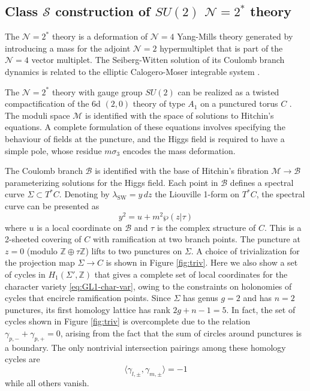 \documentclass{article}
\numberwithin{equation}{section}
\newcommand{\IZ}{\mathbb{Z}}
\newcommand{\CS}{\mathcal{S}}
\def\be{\begin{equation}}
\def\ee{\end{equation}}
\def\IZ{{\mathbb{Z}}}
\def\CB{{\mathcal{B}}}
\def\CM{{\mathcal{M}}}
\def\CN{{\mathcal{N}}}
\begin{document}
\subsection{Class $\CS$ construction of $SU(2)$ $\CN=2^*$ theory}\label{sec:class-S-construction}

The $\CN=2^*$ theory is a deformation of $\CN=4$ Yang-Mills theory generated by introducing a mass for the adjoint $\CN=2$ hypermultiplet that is part of the $\CN=4$ vector multiplet.
The Seiberg-Witten solution of its Coulomb branch dynamics is related to the elliptic Calogero-Moser integrable system \cite{Donagi:1995cf, Gorsky:1995zq, Martinec:1995by, DHoker:1997hut}.

The $\CN=2^*$ theory with gauge group $SU(2)$ can be realized as a twisted compactification of the 6d $(2,0)$ theory of type $A_{1}$ on a punctured torus $C$ \cite{Gaiotto:2009gz, Gaiotto:2009we}. 
The moduli space $\CM$ is identified with the space of solutions to Hitchin's equations.
A complete formulation of these equations involves specifying the behaviour of fields at the puncture, and the Higgs field is required to have a simple pole, whose residue $m\sigma_3$ encodes the mass deformation.


The Coulomb branch $\CB$ is identified with the base of Hitchin's fibration $\CM\to \CB$ parameterizing solutions for the Higgs field. Each point in $\CB$ defines a spectral curve $\Sigma\subset T^*C$.
Denoting by $\lambda_{\text{SW}} = y \, dz$ the Liouville 1-form on $T^*C$, the spectral curve can be presented as
\be\label{eq:SW-curve-N2star}
	y^2 = u + m^2 \wp(z|\tau) 
\ee
where $u$ is a local coordinate on $\CB$ and $\tau$ is the complex structure of $C$.
This is a 2-sheeted covering of $C$ with ramification at two branch points. The puncture at $z=0$ (modulo $\IZ\oplus \tau \IZ$) lifts to two punctures on $\Sigma$.
A choice of trivialization for the projection map $\Sigma\to C$ is shown in Figure \ref{fig:triv}. 
Here we also show a set of cycles in $H_1(\Sigma',\IZ)$ that gives a complete set of local coordinates for the character variety \eqref{eq:GL1-char-var}, owing to the constraints on holonomies of cycles that encircle ramification points. 
Since $\Sigma$ has genus $g=2$ and has $n=2$ punctures, its first homology lattice has rank $2g + n-1 = 5$.
In fact, the set of cycles shown in Figure \ref{fig:triv} is overcomplete due to the relation $\gamma_{p,-} +\gamma_{p,+} = 0$, arising from the fact that the sum of circles around punctures is a boundary.
The only nontrivial intersection pairings among these homology cycles are
\be\label{eq:homology-generators-pairings}
	\langle\gamma_{l,\pm},\gamma_{m,\pm}\rangle=-1
\ee
while all others vanish. 
\end{document}
